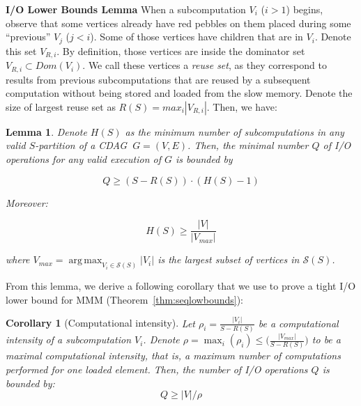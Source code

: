 \documentclass[sigplan,review,anonymous,10pt]{acmart}\settopmatter{printfolios=true,printccs=false,printacmref=false}
\newtheorem*{corollary*}{Corollary}
\DeclareMathOperator*{\argmax}{arg\,max}
\newtheorem{lma}{Lemma}
\newcommand{\macb}[1]{\textbf{\textsf{#1}}}
\begin{document}
\macb{I/O Lower Bounds Lemma}
%
When a subcomputation $V_i$ ($i > 1$) begins, observe that some vertices already 
have red pebbles on them placed during some ``previous'' $V_j$ ($j < i$). Some of those 
vertices have children that are in $V_i$. Denote this set 
$V_{R,i}$. By 
definition, those vertices are inside the dominator set $V_{R,i} \subset 
Dom(V_i)$. We call 
these vertices a \emph{reuse set}, as they correspond to results from 
previous subcomputations that are reused by a subsequent computation without 
being stored and loaded from the slow memory. Denote the size of largest reuse 
set as $R(S) = max_i|V_{R,i}|$. Then, we have:

\begin{lma}
	\label{lma:reuse}
	Denote $H(S)$ as the minimum number of subcomputations in any valid 
	$S$-partition of a CDAG $\ G=(V,E)$. Then,
	the minimal number $Q$ of I/O operations for any valid execution of $G$ 
	 is bounded by  
	
	\vspace{-0.5em}
	\begin{equation}
	Q \ge (S - R(S)) \cdot (H(S) - 1)
	\label{eq:reusebound} \end{equation}
	\vspace{-0.5em}
	
	\noindent
	Moreover: 
	
	\vspace{-0.5em}
	\begin{equation}\label{eq:reusebound-pmax}
	H(S) \ge \frac{|V|}{|V_{max}|}
	\end{equation}
	\vspace{-0.5em}
	
	\noindent
	where $V_{max} = \argmax_{V_i \in \mathcal{S}(S)}|V_i|$ is 
	the largest
	subset of vertices in $\mathcal{S}(S)$.
\end{lma}
 
From this lemma, we derive a following corollary that we use to prove a tight 
I/O lower bound for MMM (Theorem~\ref{thm:seqlowbounds}):

\begin{corollary*}[Computational intensity]
	\label{cor:q}
	Let $\rho_i = \frac{|V_i|}{S - R(S)}$ be a \emph{computational intensity} 
	of a subcomputation $V_i$.
	Denote $\rho = \max_i(\rho_i) \le \Big(\frac{|V_{max}|}{S-R(S)}\Big)$ to be 
	a \emph{maximal computational intensity}, that is, a maximum number of 
	computations performed for one loaded element. 
	Then, the number of I/O operations $Q$ is bounded by:
	\begin{equation}
	Q \ge {|V|}/{\rho}
	\end{equation} 
\end{corollary*}
\end{document}
